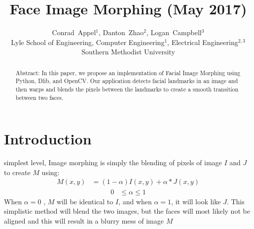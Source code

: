 \documentclass[journal]{IEEEtran}
\begin{document}
%
\title{Face Image Morphing (May 2017)}


\author{Conrad~Appel$^1$, Danton~Zhao$^2$, Logan~Campbell$^3$\\ 
		Lyle School of Engineering, Computer Engineering$^1$, Electrical Engineering$^{2,3}$\\
		Southern Methodist University
        }
        





\maketitle

\begin{abstract}
Abstract: In this paper, we propose an implementation of Facial Image Morphing using Python, Dlib, and OpenCV. Our application detects facial landmarks in an image and then warps and blends the pixels between the landmarks to create a smooth transition between two faces.
\end{abstract}



%
\IEEEpeerreviewmaketitle



\section{Introduction}
 simplest level, Image morphing is simply the blending of pixels of image $I$ and $J$ to create $M$ using: 
\begin{align} \label{eq:1}
M(x,y) &= (1-\alpha)I(x,y) + \alpha*J(x,y) 
\end{align}
\begin{align*}
0 &\leq \alpha \leq 1   
\end{align*}
When $\alpha = 0$ , $M$ will be identical to $I$, and when $\alpha =1$, it will look like $J$. This simplistic method will blend the two images, but the faces will most likely not be aligned and this will result in a blurry mess of image $M$ \newline 
\end{document}
